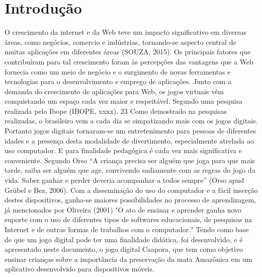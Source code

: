 \chapter{Introdução}
\label{cap:introducao}
O crescimento da internet e da Web teve um impacto significativo em diversas áreas, como negócios, comercio e indústrias, tornando-se aspecto central de muitas aplicações em diferentes áreas (SOUZA, 2015). 
Os principais fatores que contribuíram para tal crescimento foram às percepções das vantagens que a Web fornecia como um meio de negócio e o surgimento de novas ferramentas e tecnologias para o desenvolvimento e emprego de aplicações. 
Junto com a demanda do crescimento de aplicações para Web, os jogos virtuais vêm conquistando um espaço cada vez maior e respeitável.  Segundo uma pesquisa realizada pelo Ibope (IBOPE, xxxx), 23%
 Como demostrado na pesquisas realizadas, o brasileiro vem a cada dia se simpatizando mais com os jogos digitais. Portanto jogos digitais tornaram-se um entretenimento para pessoas de diferentes idades e a presença desta modalidade de divertimento, especialmente atrelada ao uso computador. E para finalidade pedagógica é cada vez mais significativa e conveniente. 
Segundo Orso “A criança precisa ser alguém que joga para que mais tarde, saiba ser alguém que age, convivendo sadiamente com as regras do jogo da vida. Saber ganhar e perder deveria acompanhar a todos sempre” (Orso apud Grübel e Bez, 2006).             
Com a disseminação do uso do computador e a fácil inserção destes dispositivos, ganha-se maiores possibilidades no processo de aprendizagem, já mencionados por Oliveira (2001) "O ato de ensinar e aprender ganha novo suporte com o uso de diferentes tipos de softwares educacionais, de pesquisas na Internet e de outras formas de trabalhos com o computador." 
Tendo como base de que um jogo digital pode ter uma finalidade didática, foi desenvolvido, e é apresentado neste documento, o jogo digital Caapora, que tem como objetivo ensinar crianças sobre a importância da preservação da mata Amazônica em um aplicativo desenvolvido para dispositivos móveis. 
